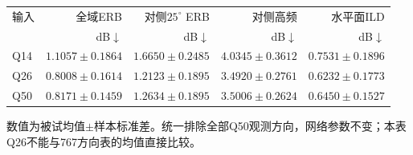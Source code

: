 \begin{table}[htbp]
\centering\small
\setlength{\tabcolsep}{4pt}
\begin{tabular}{lrrrr}
\toprule
输入 & 全域ERB & 对侧$25^\circ$ ERB & 对侧高频 & 水平面ILD\\
 & dB$\downarrow$ & dB$\downarrow$ & dB$\downarrow$ & dB$\downarrow$\\
\midrule
Q14 & $1.1057 \pm 0.1864$ & $1.6650 \pm 0.2485$ & $4.0345 \pm 0.3612$ & $0.7531 \pm 0.1896$ \\
Q26 & $0.8008 \pm 0.1614$ & $1.2123 \pm 0.1895$ & $3.4920 \pm 0.2761$ & $0.6232 \pm 0.1773$ \\
Q50 & $0.8171 \pm 0.1459$ & $1.2634 \pm 0.1895$ & $3.5006 \pm 0.2624$ & $0.6450 \pm 0.1527$ \\
\bottomrule
\end{tabular}
\par\smallskip
\parbox{\linewidth}{\footnotesize 数值为被试均值$\pm$样本标准差。统一排除全部Q50观测方向，网络参数不变；本表Q26不能与767方向表的均值直接比较。}
\end{table}
